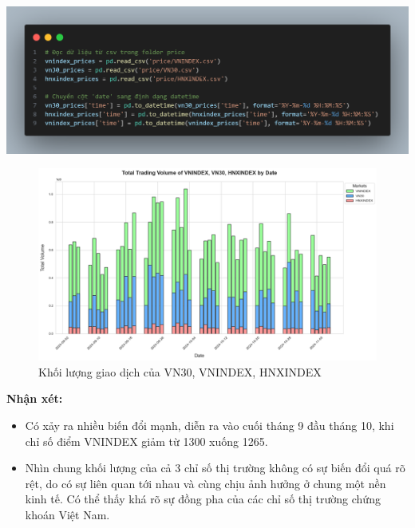 \begin{center}
    \includegraphics[width=0.9\linewidth]{images/code-2.21.png}
\end{center}
\begin{figure}[H]
    \centering
    \includegraphics[width=1\linewidth]{images/plot-2.6-column_chart.png}
    \caption{Khối lượng giao dịch của VN30, VNINDEX, HNXINDEX}
    \label{fig:3.4}
\end{figure}
\textbf{Nhận xét:}
\begin{itemize}
    \item Có xảy ra nhiều biến đổi mạnh, diễn ra vào cuối tháng 9 đầu tháng 10, khi chỉ số điểm VNINDEX giảm từ 1300 xuống 1265.
    \item Nhìn chung khối lượng của cả 3 chỉ số thị trường không có sự biến đổi quá rõ rệt, do có sự liên quan tới nhau và cùng chịu ảnh hưởng ở chung một nền kinh tế. Có thể thấy khá rõ sự đồng pha của các chỉ số thị trường chứng khoán Việt Nam.
\end{itemize}

\newpage
